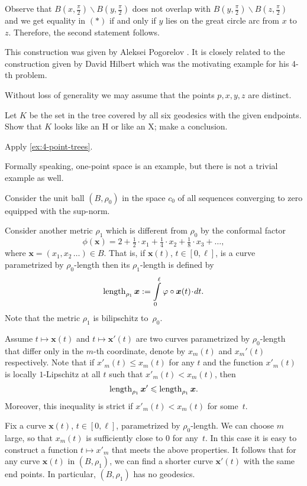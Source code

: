 Observe that
$B(x,\tfrac \pi2)\backslash B(y,\tfrac\pi2)$
does not overlap with
$B(y,\tfrac\pi2)\backslash B(z,\tfrac\pi2)$ and  we get equality in $(*)$ if and only if $y$ lies on the great circle arc from $x$ to $z$.
Therefore, the second statement follows.


This construction was given by 
Aleksei Pogorelov \cite{pogorelov}.
It is closely related to the construction given 
by David Hilbert \cite{hilbert}
which was the motivating example for his 4-th problem. 

Without loss of generality we may assume that the points $p,x,y,z$ are distinct.

Let $K$ be the set in the tree covered by all six geodesics with the given endpoints.
Show that $K$ looks like an H or like an X; make a conclusion.

Apply \ref{ex:4-point-trees}.


Formally speaking, one-point space is an example,
but there is not a trivial example as well.

Consider the unit ball $(B,\rho_0)$
in the space $c_0$ of all sequences converging to zero equipped with the sup-norm.

Consider another metric $\rho_1$ which is different from $\rho_0$ by the conformal factor
\[\phi(\bm{x})=2+\tfrac{1}2\cdot x_1+\tfrac{1}4\cdot x_2+\tfrac{1}8\cdot x_3+\dots,\]
where $\bm{x}=(x_1,x_2\,\dots)\in B$.
That is, if $\bm{x}(t)$, $t\in[0,\ell]$, is a curve parametrized by $\rho_0$-length 
then its $\rho_1$-length is defined by
\[\length_{\rho_1}\bm{x}\df\int\limits_0^\ell\phi\circ\bm{x}(t)\cdot dt.\]
Note that the metric $\rho_1$ is bilipschitz to~$\rho_0$.

Assume $t\mapsto \bm{x}(t)$ and $t\mapsto \bm{x}'(t)$ are two curves parametrized by $\rho_0$-length that differ only in the $m$-th coordinate, denote by $x_m(t)$ and $x_m'(t)$ respectively.
Note that if $x'_m(t)\le x_m(t)$ for any $t$ and 
the function $x'_m(t)$ is locally $1$-Lipschitz at all $t$ such that $x'_m(t)< x_m(t)$, then 
\[\mathop{\rm length}\nolimits_{\rho_1}\bm{x}'\leqslant \mathop{\rm length}\nolimits_{\rho_1}\bm{x}.\]
Moreover, this inequality is strict if $x'_m(t)< x_m(t)$ for some~$t$.

Fix a curve $\bm{x}(t)$, $t\in[0,\ell]$, parametrized by  $\rho_0$-length.
We can choose $m$ large, so that $x_m(t)$ is sufficiently close to $0$ for any~$t$.
In this case it is easy to construct a function $t\mapsto x'_m$ that meets the above properties.
It follows that for any curve $\bm{x}(t)$ in $(B,\rho_1)$, we can find a shorter curve $\bm{x}'(t)$ with the same end points.
In particular, $(B,\rho_1)$ has no geodesics.

